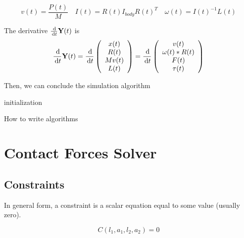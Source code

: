 \begin{equation}
    v(t) = \frac{P(t)}{M} \quad
    {I(t)} = R(t)I_{body}R(t)^{T} \quad
    \omega(t) = I(t)^{-1}L(t)
\end{equation}

The derivative $\frac{\,\mathrm{d}}{\,\mathrm{d} t}\textbf{Y}(t)$ is
\begin{equation}
    \frac{\,\mathrm{d}}{\,\mathrm{d}{t}}\textbf{Y}(t) = \frac{\,\mathrm{d}}{\,\mathrm{d} t}\left(
        \begin{array}{c}
            x(t) \\
            R(t) \\
            M v(t) \\
            L(t) \\
        \end{array}
    \right) = \frac{\,\mathrm{d}}{\,\mathrm{d} t}\left(
        \begin{array}{c}
            v(t) \\
            \omega(t)*R(t) \\
            F(t) \\
            \tau(t) \\
        \end{array}
    \right)
\end{equation}

Then, we can conclude the simulation algorithm

\begin{algorithm}[H]
 initialization\;
 \caption{How to write algorithms}
\end{algorithm}


\section{Contact Forces Solver}

\subsection{Constraints}
    In general form, a constraint is a scalar equation equal to some value (usually zero).

\begin{equation}
C( l_1, a_1, l_2, a_2 ) = 0
\label{eq1}
\end{equation}


